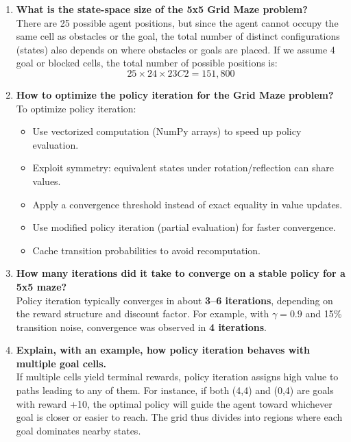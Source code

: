\documentclass[a4paper,11pt,oneside]{book}
\begin{document}
\begin{enumerate}
    \item \textbf{What is the state-space size of the 5x5 Grid Maze problem?}\\
    There are 25 possible agent positions, but since the agent cannot occupy the same cell as obstacles or the goal, the total number of distinct configurations (states) also depends on where obstacles or goals are placed. If we assume 4 goal or blocked cells, the total number of possible positions is:
    \[
    25 \times 24 \times 23C2 = 151{,}800
    \]

    \item \textbf{How to optimize the policy iteration for the Grid Maze problem?}\\
    To optimize policy iteration:
    \begin{itemize}
        \item Use vectorized computation (NumPy arrays) to speed up policy evaluation.
        \item Exploit symmetry: equivalent states under rotation/reflection can share values.
        \item Apply a convergence threshold instead of exact equality in value updates.
        \item Use modified policy iteration (partial evaluation) for faster convergence.
        \item Cache transition probabilities to avoid recomputation.
    \end{itemize}

    \item \textbf{How many iterations did it take to converge on a stable policy for a 5x5 maze?}\\
    Policy iteration typically converges in about \textbf{3–6 iterations}, depending on the reward structure and discount factor. For example, with $\gamma = 0.9$ and 15\% transition noise, convergence was observed in \textbf{4 iterations}.

    \item \textbf{Explain, with an example, how policy iteration behaves with multiple goal cells.}\\
    If multiple cells yield terminal rewards, policy iteration assigns high value to paths leading to any of them. For instance, if both (4,4) and (0,4) are goals with reward +10, the optimal policy will guide the agent toward whichever goal is closer or easier to reach. The grid thus divides into regions where each goal dominates nearby states.


\end{enumerate}
\end{document}
